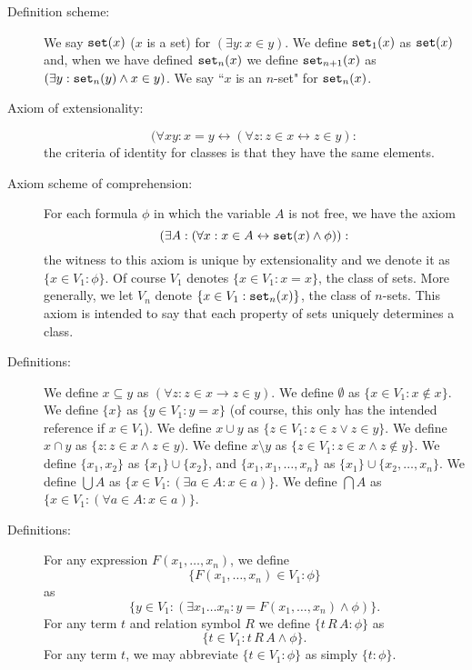 \documentclass[12pt]{article}
\begin{document}
\begin{description}

\item[Definition scheme:]  We say ${\tt set\/}(x)$ ($x$ is a set) for $(\exists y:x \in y)$.  We define ${\tt set}_1(x)$ as ${\tt set}(x)$ and, when we have defined
${\tt set}_n(x)$ we define ${\tt set}_{n+1}(x)$ as $(\exists y: {\tt set}_n(y) \wedge x \in y)$.  We say ``$x$ is an $n$-set" for ${\tt set}_n(x)$.

\item[Axiom of extensionality:]  $$(\forall xy:x=y \leftrightarrow (\forall z:z \in x \leftrightarrow z \in y):$$  the criteria of identity for classes is that they have the same elements.

\item[Axiom scheme of comprehension:]  For each formula $\phi$ in which the variable $A$ is not free, we have the axiom $$(\exists A:(\forall x:x \in A \leftrightarrow {\tt set}(x) \wedge \phi)):$$  the witness to this axiom is unique by extensionality and we denote it as $\{x \in V_1:\phi\}$.  Of course $V_1$ denotes $\{x \in V_1:x=x\}$, the class of sets.  More generally, we let
$V_n$ denote $\{x \in V_1:{\tt set}_n(x)\}$, the class of $n$-sets.  This axiom is intended to say that each property of sets uniquely determines a class.

\item[Definitions:] We define $x \subseteq y$ as $(\forall z:z \in x \rightarrow z \in y)$.  We define $\emptyset$ as $\{x \in V_1:x \not\in x\}$.  We define $\{x\}$ as $\{y \in V_1:y=x\}$ (of course, this only has the intended reference if $x \in V_1$).
We define $x \cup y$ as $\{z \in V_1:z \in z \vee z \in y\}$.   We define $x \cap y$ as $\{z:z \in x \wedge z \in y)$.  We define $x \setminus y$ as $\{z \in V_1:z \in x \wedge z \not\in y\}$.  We define $\{x_1,x_2\}$ as $\{x_1\} \cup \{x_2\}$,
and $\{x_1,x_1,\ldots,x_n\}$ as $\{x_1\} \cup \{x_2,\ldots,x_n\}$.  We define $\bigcup A$ as $\{x \in V_1:(\exists a \in A:x \in a)\}$.  We define $\bigcap A$ as $\{x \in V_1:(\forall a \in A:x \in a)\}$.

\item[Definitions:]  For any expression $F(x_1,\ldots,x_n)$, we define $$\{F(x_1,\ldots,x_n)\in V_1:\phi\}$$ as $$\{y \in V_1:(\exists x_1\ldots x_n:y = F(x_1,\ldots,x_n) \wedge \phi)\}.$$  For any term $t$ and relation symbol $R$ we define $\{t\,R\,A:\phi\}$ as $$\{t \in V_1:t \,R\,A \wedge \phi\}.$$  For any term $t$, we may abbreviate $\{t \in V_1:\phi\}$ as simply $\{t :\phi\}$.


\end{description}
\end{document}

